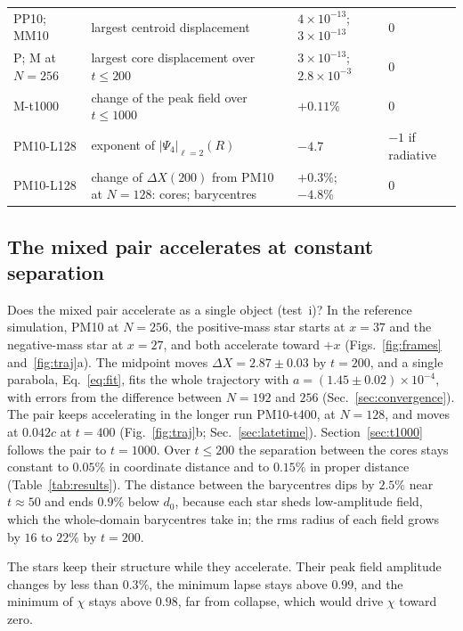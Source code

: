 \documentclass[twocolumn,floatfix,aps,prd,superscriptaddress,nofootinbib]{revtex4-2}
\begin{document}
\begin{table}[t]
\begin{ruledtabular}
\begin{tabular}{lp{}p{}l}
PP10; MM10 & largest centroid displacement & $4\times10^{-13}$; $3\times10^{-13}$ & 0 \\
P; M at $N=256$ & largest core displacement over $t\le200$ & $3\times10^{-13}$; $2.8\times10^{-3}$ & 0 \\
M-t1000 & change of the peak field over $t\le1000$ & $+0.11\%$ & 0 \\
PM10-L128 & exponent of $|\Psi_4|_{\ell=2}(R)$ & $-4.7$ & $-1$ if radiative \\
PM10-L128 & change of $\Delta X(200)$ from PM10 at $N=128$: cores; barycentres & $+0.3\%$; $-4.8\%$ & 0 \\
\end{tabular}
\end{ruledtabular}
\end{table}

\subsection{The mixed pair accelerates at constant separation}
\label{sec:runaway}

Does the mixed pair accelerate as a single object (test~i)? In the reference simulation, PM10 at $N=256$, the positive-mass star starts at $x=37$ and the negative-mass star at $x=27$, and both accelerate toward $+x$ (Figs.~\ref{fig:frames} and~\ref{fig:traj}a). The midpoint moves $\Delta X=2.87\pm0.03$ by $t=200$, and a single parabola, Eq.~\eqref{eq:fit}, fits the whole trajectory with $a=(1.45\pm0.02)\times10^{-4}$, with errors from the difference between $N=192$ and $256$ (Sec.~\ref{sec:convergence}). The pair keeps accelerating in the longer run PM10-t400, at $N=128$, and moves at $0.042c$ at $t=400$ (Fig.~\ref{fig:traj}b; Sec.~\ref{sec:latetime}). Section~\ref{sec:t1000} follows the pair to $t=1000$. Over $t\le200$ the separation between the cores stays constant to $0.05\%$ in coordinate distance and to $0.15\%$ in proper distance (Table~\ref{tab:results}). The distance between the barycentres dips by $2.5\%$ near $t\approx50$ and ends $0.9\%$ below $d_0$, because each star sheds low-amplitude field, which the whole-domain barycentres take in; the rms radius of each field grows by $16$ to $22\%$ by $t=200$.

The stars keep their structure while they accelerate. Their peak field amplitude changes by less than $0.3\%$, the minimum lapse stays above $0.99$, and the minimum of $\chi$ stays above $0.98$, far from collapse, which would drive $\chi$ toward zero.
\end{document}
